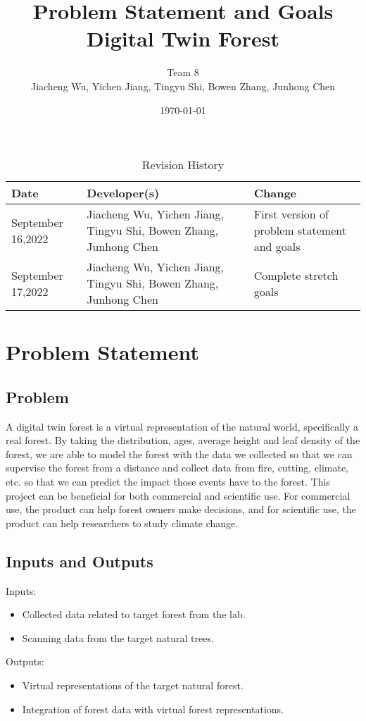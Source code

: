 \documentclass{article}
\title{Problem Statement and Goals\\ Digital Twin Forest}
\author{Team 8\\Jiacheng Wu, Yichen Jiang, Tingyu Shi, Bowen Zhang, Junhong Chen}
\date{\today}
\begin{document}
\maketitle

\begin{table}[hp]
\centering
\caption{Revision History} \label{TblRevisionHistory}
\begin{tabularx}{11cm}{X X X}
\toprule
\textbf{Date} & \textbf{Developer(s)} & \textbf{Change}\\
\midrule
September 16,2022 & Jiacheng Wu, Yichen Jiang, Tingyu Shi, Bowen Zhang, Junhong Chen & First version of problem statement and goals\\
\hline
September 17,2022 & Jiacheng Wu, Yichen Jiang, Tingyu Shi, Bowen Zhang, Junhong Chen & Complete stretch goals\\
\bottomrule
\end{tabularx}
\end{table}

\section{Problem Statement}
\subsection{Problem}
A digital twin forest is a virtual representation of the natural world, specifically a
real forest. By taking the distribution, ages, average height and leaf density of the
forest, we are able to model the forest with the data we collected so that we can
 supervise the forest from a distance and collect data from fire, cutting, climate,
etc. so that we can predict the impact those events have to the forest. This
 project can be beneficial for both commercial and scientific use. For commercial use,
 the product can help forest owners make decisions, and for scientific use, the product can help researchers to study climate change.

\subsection{Inputs and Outputs}

Inputs:
\begin{itemize}
    \item Collected data related to target forest from the lab. 
    \item Scanning data from the target natural trees.
\end{itemize}
Outputs:
\begin{itemize}
    \item Virtual representations of the target natural forest.
    \item Integration of forest data with virtual forest representations.
\end{itemize}
\end{document}
